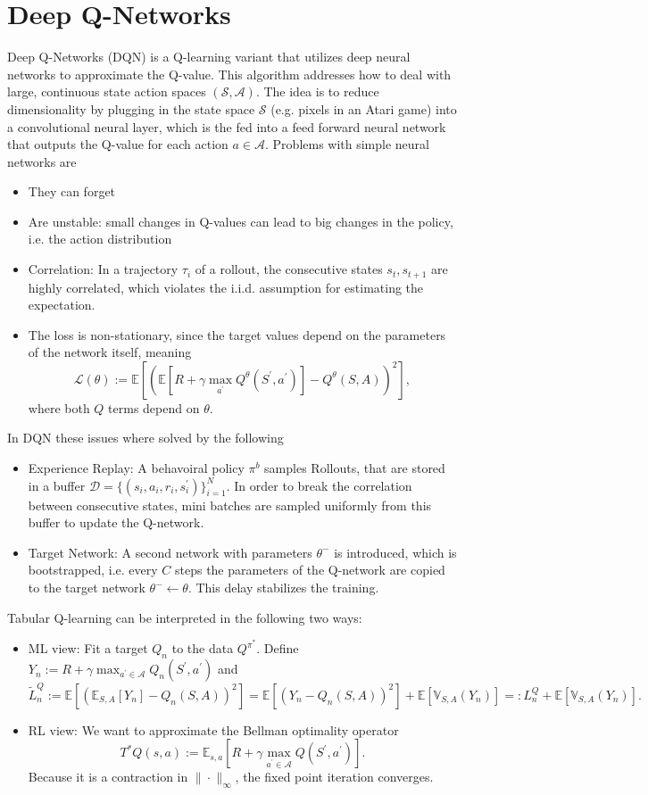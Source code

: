 \documentclass[../main.tex]{subfiles}  %
\begin{document}
\section{Deep Q-Networks}
Deep Q-Networks (DQN) is a Q-learning variant that utilizes deep neural networks to approximate the Q-value. This algorithm addresses how to deal with large, continuous state action spaces $(\mathcal{S},\mathcal{A})$. The idea is to reduce dimensionality by plugging in the state space $\mathcal{S}$ (e.g. pixels in an Atari game) into a convolutional neural layer, which is the fed into a feed forward neural network that outputs the Q-value for each action $a \in \mathcal{A}$. Problems with simple neural networks are 
\begin{itemize}
    \item They can forget
    \item Are unstable: small changes in Q-values can lead to big changes in the policy, i.e. the action distribution 
    \item Correlation: In a trajectory $\tau_i$ of a rollout, the consecutive states $s_t,s_{t+1}$ are highly correlated, which violates the i.i.d. assumption for estimating the expectation.
    \item The loss is non-stationary, since the target values depend on the parameters of the network itself, meaning 
    \[
    \mathcal{L} (\theta) := \mathbb{E}[(\mathbb{E}[R+ \gamma \max_{a^\prime} Q^\theta (S^\prime,a^\prime)] - Q^\theta (S,A))^2],
    \]
    where both $Q$ terms depend on $\theta$.
\end{itemize}
In DQN these issues where solved by the following 
\begin{itemize}
    \item Experience Replay: A behavoiral policy $\pi^b$ samples Rollouts, that are stored in a buffer $\mathcal{D} = \{(s_i,a_i,r_i,s_i^\prime)\}_{i=1}^N$. In order to break the correlation between consecutive states, mini batches are sampled uniformly from this buffer to update the Q-network.
    \item Target Network: A second network with parameters $\theta^-$ is introduced, which is bootstrapped, i.e. every $C$ steps the parameters of the Q-network are copied to the target network $\theta^- \leftarrow \theta$. This delay stabilizes the training.
\end{itemize}
Tabular Q-learning can be interpreted in the following two ways: 
\begin{itemize}
    \item ML view: Fit a target $Q_n$ to the data $Q^{\pi^*}$. Define $Y_n := R + \gamma \max_{a^\prime \in \mathcal{A}} Q_n (S^\prime,a^\prime)$ and 
    \[
    \tilde{L}_n^Q := \mathbb{E} [ (\mathbb{E}_{S,A} [Y_n] - Q_n (S,A))^2 ] = \mathbb{E}[(Y_n - Q_n (S,A))^2] + \mathbb{E}[ \mathbb{V}_{S,A} (Y_n)]=: L_n^Q + \mathbb{E}[ \mathbb{V}_{S,A} (Y_n)].
    \]
    \item RL view: We want to approximate the Bellman optimality operator 
    \[
    T^* Q(s,a) := \mathbb{E}_{s,a} [R + \gamma \max_{a^\prime \in \mathcal{A}} Q(S^\prime,a^\prime)].
    \]
    Because it is a contraction in $\| \cdot \|_\infty$, the fixed point iteration converges.
\end{itemize}
\end{document}
